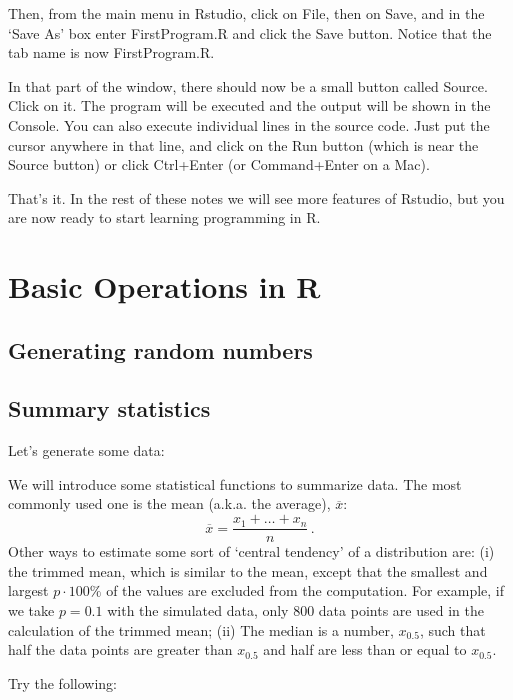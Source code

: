 Then, from the main menu in Rstudio, click on File, then on Save, and in the `Save As' box enter FirstProgram.R and click the Save button.
Notice that the tab name is now FirstProgram.R.

In that part of the window, there should now be a small button called Source. Click on it. The program will be executed and the output will be shown in the Console. You can also execute individual lines in the source code. Just put the cursor anywhere in that line, and click on the Run button (which is near the Source button) or click Ctrl+Enter (or Command+Enter on a Mac). 

That's it. In the rest of these notes we will see more features of Rstudio, but you are now ready to start learning programming in R.


\section{Basic Operations in R}
\subsection{Generating random numbers}



\subsection{Summary statistics}
Let's generate some data:


We will introduce some statistical functions to summarize data. The most commonly used one is the mean (a.k.a. the average), $\overline{x}$:\\
$$\overline{x}=\frac{x_1+\ldots+x_n}{n}\,.$$
Other ways to estimate some sort of `central tendency' of a distribution are:
 (i) the trimmed mean, which is similar to the mean, except that the smallest and largest $p\cdot 100\%$  of the values are excluded from the computation. For example, if we take $p=0.1$ with the simulated data, only 800 data points are used in the calculation of the trimmed mean; (ii) The median is a number, $x_{0.5}$, such that half the data points are greater than $x_{0.5}$ and half are less than or equal to $x_{0.5}$. 

Try the following:


